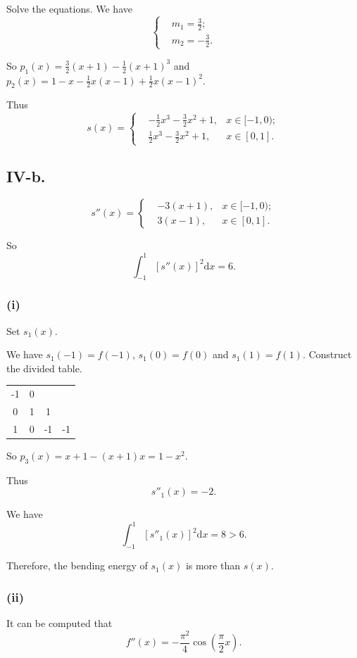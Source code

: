 \documentclass[a4paper]{article}
\begin{document}
Solve the equations. We have 
$$
\left\{
\begin{aligned}
  &m_1=\frac{3}{2};\\
  &m_2=-\frac{3}{2}.
\end{aligned}
\right.
$$

So $p_1(x)=\frac{3}{2}(x+1)-\frac{1}{2}(x+1)^3$ and $p_2(x)=1-x-\frac{1}{2}x(x-1)+\frac{1}{2}x(x-1)^2$.

Thus
$$
s(x)=
\left\{
\begin{aligned}
  &-\frac{1}{2}x^3-\frac{3}{2}x^2+1, &x\in [-1,0);\\
  &\frac{1}{2}x^3-\frac{3}{2}x^2+1, &x\in [0,1].
\end{aligned}
\right.
$$

\subsection*{IV-b.}
$$
s''(x)=
\left\{
\begin{aligned}
  &-3(x+1), &x\in [-1,0);\\
  &3(x-1), &x\in [0,1].
\end{aligned}
\right.
$$

So 
$$
\int_{-1}^{1}[s''(x)]^2 \mathrm{d}x=6.
$$

\subsubsection*{(i)}
Set $s_1(x)$.

We have $s_1(-1)=f(-1)$, $s_1(0)=f(0)$ and $s_1(1)=f(1)$. Construct the divided table.

\begin{table}[H]
  \centering
  \begin{tabular}{c|ccc}
    -1 & 0 & &  \\
    0 & 1 & 1 &   \\
    1 & 0 & -1 & -1  \\
  \end{tabular}
\end{table}

So $p_3(x)=x+1-(x+1)x=1-x^2$.

Thus 
$$
s''_1(x)=-2.
$$

We have 
$$
\int_{-1}^{1}[s''_1(x)]^2 \mathrm{d}x=8>6.
$$

Therefore, the bending energy of $s_1(x)$ is more than $s(x)$.

\subsubsection*{(ii)}
It can be computed that $$f''(x)=-\frac{\pi^2}{4}\cos(\frac{\pi}{2}x).$$
\end{document}
